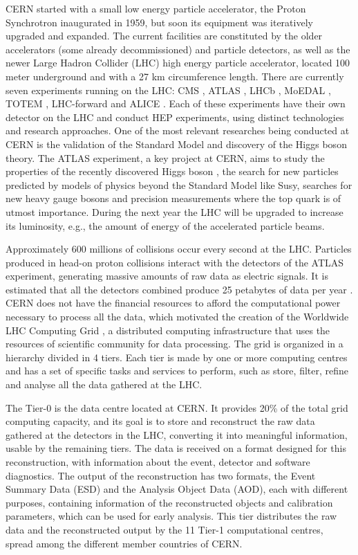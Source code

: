 CERN started with a small low energy particle accelerator, the Proton Synchrotron \cite{CERN:PS} inaugurated in 1959, but soon its equipment was iteratively upgraded and expanded. The current facilities are constituted by the older accelerators (some already decommissioned) and particle detectors, as well as the newer Large Hadron Collider (LHC) \cite{CERN:LHC} high energy particle accelerator, located 100 meter underground and with a 27 km circumference length. There are currently seven experiments running on the LHC: CMS \cite{CERN:CMS}, ATLAS \cite{CERN:ATLAS}, LHCb \cite{CERN:LHCb}, MoEDAL \cite{CERN:MoEDAL}, TOTEM \cite{CERN:TOTEM}, LHC-forward \cite{CERN:LHCf} and ALICE \cite{CERN:ALICE}. Each of these experiments have their own detector on the LHC and conduct HEP experiments, using distinct technologies and research approaches. One of the most relevant researches being conducted at CERN is the validation of the Standard Model and discovery of the Higgs boson theory. The ATLAS experiment, a key project at CERN, aims to study the properties of the recently discovered Higgs boson \cite{Higgs}, the search for new particles predicted by models of physics beyond the Standard Model like Susy, searches for new heavy gauge bosons and precision measurements where the top quark is of utmost importance. During the next year the LHC will be upgraded to increase its luminosity, e.g., the amount of energy of the accelerated particle beams.

Approximately 600 millions of collisions occur every second at the LHC. Particles produced in head-on proton collisions interact with the detectors of the ATLAS experiment, generating massive amounts of raw data as electric signals. It is estimated that all the detectors combined produce 25 petabytes of data per year \cite{CERN:DATA1,CERN:DATA2}. CERN does not have the financial resources to afford the computational power necessary to process all the data, which motivated the creation of the Worldwide LHC Computing Grid \cite{CERN:WLHCCG}, a distributed computing infrastructure that uses the resources of scientific community for data processing. The grid is organized in a hierarchy divided in 4 tiers. Each tier is made by one or more computing centres and has a set of specific tasks and services to perform, such as store, filter, refine and analyse all the data gathered at the LHC.

The Tier-0 is the data centre located at CERN. It provides 20\% of the total grid computing capacity, and its goal is to store and reconstruct the raw data gathered at the detectors in the LHC, converting it into meaningful information, usable by the remaining tiers. The data is received on a format designed for this reconstruction, with information about the event, detector and software diagnostics. The output of the reconstruction has two formats, the Event Summary Data (ESD) and the Analysis Object Data (AOD), each with different purposes, containing information of the reconstructed objects and calibration parameters, which can be used for early analysis. This tier distributes the raw data and the reconstructed output by the 11 Tier-1 computational centres, spread among the different member countries of CERN.

